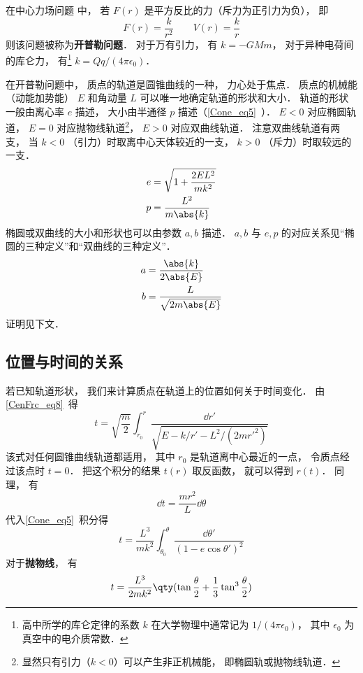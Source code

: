 
在中心力场问题 中， 若 $F(r)$ 是平方反比的力（斥力为正引力为负）， 即
\begin{equation}
F(r) = \frac{k}{r^2}  \qquad V(r) = \frac{k}{r}
\end{equation}
则该问题被称为\textbf{开普勒问题}． 对于万有引力， 有 $k = -GMm$， 对于异种电荷间的库仑力， 有\footnote{高中所学的库仑定律的系数 $k$ 在大学物理中通常记为 $1/(4\pi\epsilon_0)$， 其中 $\epsilon_0$ 为真空中的电介质常数．} $k = Qq/(4\pi\epsilon_0)$．

在开普勒问题中， 质点的轨道是圆锥曲线的一种， 力心处于焦点． 质点的机械能（动能加势能） $E$ 和角动量 $L$ 可以唯一地确定轨道的形状和大小． 轨道的形状一般由离心率 $e$ 描述， 大小由半通径 $p$ 描述（\autoref{Cone_eq5}~）． $E < 0$ 对应椭圆轨道， $E = 0$ 对应抛物线轨道\footnote{显然只有引力（$k < 0$）可以产生非正机械能， 即椭圆轨或抛物线轨道．}， $E > 0$ 对应双曲线轨道． 注意双曲线轨道有两支， 当 $k < 0$ （引力）时取离中心天体较近的一支， $k > 0$ （斥力）时取较远的一支．
\begin{align}
e &= \sqrt{1 + \frac{2EL^2}{mk^2}}\label{CelBd_eq2}\\
p &= \frac{L^2}{m\abs{k}}\label{CelBd_eq3}
\end{align}
椭圆或双曲线的大小和形状也可以由参数 $a,b$ 描述． $a,b$ 与 $e,p$ 的对应关系见“椭圆的三种定义”和“双曲线的三种定义”．
\begin{align}
a &= \frac{\abs{k}}{2\abs{E}}\label{CelBd_eq7}\\
b &= \frac{L}{\sqrt{2m\abs{E}}}\label{CelBd_eq8}
\end{align}
证明见下文．

\subsection{位置与时间的关系}
若已知轨道形状， 我们来计算质点在轨道上的位置如何关于时间变化． 由\autoref{CenFrc_eq8}~得
\begin{equation}
t = \sqrt{\frac{m}{2}} \int_{r_0}^r \frac{\dd{r'}}{\sqrt{E - k/r' - L^2/(2mr'^2)}}
\end{equation}
该式对任何圆锥曲线轨道都适用， 其中 $r_0$ 是轨道离中心最近的一点， 令质点经过该点时 $t= 0$． 把这个积分的结果 $t(r)$ 取反函数， 就可以得到 $r(t)$． 同理， 有
\begin{equation}
\dd{t} = \frac{mr^2}{L}\dd{\theta}
\end{equation}
代入\autoref{Cone_eq5}~积分得
\begin{equation}
t = \frac{L^3}{mk^2} \int_{\theta_0}^\theta \frac{\dd{\theta'}}{(1 - e\cos \theta')^2 }
\end{equation}
对于\textbf{抛物线}， 有
\begin{equation}
t = \frac{L^3}{2mk^2} \qty(\tan\frac{\theta}{2} +  \frac{1}{3}\tan^3 \frac{\theta}{2})
\end{equation}

